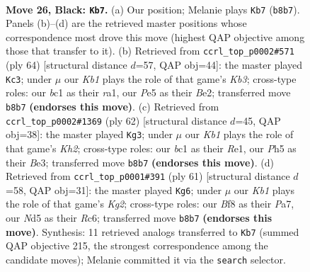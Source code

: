 \documentclass[11pt]{article}
\begin{document}
\clearpage

\begin{figure}[p]\centering
\begin{subfigure}{0.46\textwidth}\centering
\resizebox{\linewidth}{!}{%
\newchessgame
\chessboard[
  setfen={rk3b1r/p7/8/1BPnpP1p/1P5R/8/8/R1B1K3 b Q - 2 26},
  showmover=false,
  pgfstyle=straightmove, color=movearrow, markmove={b8-b7}
]}
\caption{}
\end{subfigure}\hfill
\begin{subfigure}{0.46\textwidth}\centering
\resizebox{\linewidth}{!}{%
\newchessgame
\chessboard[
  setfen={5k2/5p1p/4b3/pR6/2Pr4/1K6/2R1B1PP/r7 w - - 6 33},
  showmover=false,
  pgfstyle=straightmove, color=movearrow, markmove={b3-c3}
]}
\caption{}
\end{subfigure}
\\[4pt]
\begin{subfigure}{0.46\textwidth}\centering
\resizebox{\linewidth}{!}{%
\newchessgame
\chessboard[
  setfen={3r2k1/4r1p1/6bp/8/2p3P1/4BP1P/2P1R2K/4R3 w - - 0 32},
  showmover=false,
  pgfstyle=straightmove, color=movearrow, markmove={h2-g3}
]}
\caption{}
\end{subfigure}\hfill
\begin{subfigure}{0.46\textwidth}\centering
\resizebox{\linewidth}{!}{%
\newchessgame
\chessboard[
  setfen={8/p4rk1/P1r1p3/1R5p/2p4P/8/2R2PP1/5K2 b - - 1 31},
  showmover=false,
  pgfstyle=straightmove, color=movearrow, markmove={g7-g6}
]}
\caption{}
\end{subfigure}
\caption{\textbf{Move 26, Black: \texttt{Kb7}.} (a) Our position; Melanie plays \texttt{Kb7} (\texttt{b8b7}). Panels (b)--(d) are the retrieved master positions whose correspondence most drove this move (highest QAP objective among those that transfer to it). (b) Retrieved from \texttt{ccrl\_top\_p0002\#571} (ply 64) [structural distance $d$=57, QAP obj=44]: the master played \texttt{Kc3}; under $\mu$ our \emph{Kb1} plays the role of that game's \emph{Kb3}; cross-type roles: our \emph{b}c1 as their \emph{r}a1, our \emph{P}e5 as their \emph{B}e2; transferred move \texttt{b8b7} \textbf{(endorses this move)}. (c) Retrieved from \texttt{ccrl\_top\_p0002\#1369} (ply 62) [structural distance $d$=45, QAP obj=38]: the master played \texttt{Kg3}; under $\mu$ our \emph{Kb1} plays the role of that game's \emph{Kh2}; cross-type roles: our \emph{b}c1 as their \emph{R}e1, our \emph{P}h5 as their \emph{B}e3; transferred move \texttt{b8b7} \textbf{(endorses this move)}. (d) Retrieved from \texttt{ccrl\_top\_p0001\#391} (ply 61) [structural distance $d$=58, QAP obj=31]: the master played \texttt{Kg6}; under $\mu$ our \emph{Kb1} plays the role of that game's \emph{Kg2}; cross-type roles: our \emph{B}f8 as their \emph{P}a7, our \emph{N}d5 as their \emph{R}c6; transferred move \texttt{b8b7} \textbf{(endorses this move)}. Synthesis: 11 retrieved analogs transferred to \texttt{Kb7} (summed QAP objective 215, the strongest correspondence among the candidate moves); Melanie committed it via the \texttt{search} selector.}
\label{fig:thought-m51}
\end{figure}
\end{document}

